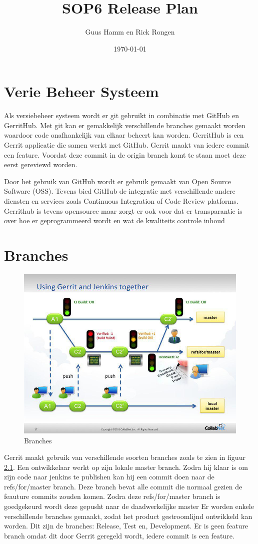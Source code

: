 \documentclass{scrreprt}
\title{SOP6 Release Plan}
\author{Guus Hamm en Rick Rongen}
\date{\today}
\begin{document}
	\maketitle
	\tableofcontents
	\newpage
	\chapter{Verie Beheer Systeem}
	Als versiebeheer systeem wordt er git gebruikt in combinatie met GitHub en GerritHub. Met git kan er gemakkelijk verschillende branches gemaakt worden waardoor code onafhankelijk van elkaar beheert kan worden.
	GerritHub is een Gerrit applicatie die samen werkt met GitHub. Gerrit maakt van iedere commit een feature. Voordat deze commit in de origin branch komt te staan moet deze eerst gereviewd worden. 
	
	Door het gebruik van GitHub wordt er gebruik gemaakt van Open Source Software (OSS). Tevens bied GitHub de integratie met verschillende andere diensten en services zoals Continuous Integration of Code Review platforms. Gerrithub is tevens opensource maar zorgt er ook voor dat er transparantie is over hoe er geprogrammeerd wordt en wat de kwaliteits controle inhoud
	\chapter{Branches}
	\begin{figure}[H]
		\centering
		\includegraphics[width=\textwidth]{git-gerrit-jenkins}
		\caption{Branches}
		\label{img:branches}
	\end{figure}
	
	Gerrit maakt gebruik van verschillende soorten branches zoals te zien in figuur {\ref{img:branches}}. Een ontwikkelaar werkt op zijn lokale master branch. Zodra hij klaar is om zijn code naar jenkins te publishen kan hij een commit doen naar de refs/for/master branch. Deze branch bevat alle commit die normaal gezien de feauture commits zouden komen. Zodra deze refs/for/master branch is goedgekeurd wordt deze gepusht naar de daadwerkelijke master
	Er worden enkele verschillende branches gemaakt, zodat het product gestroomlijnd ontwikkeld kan worden. Dit zijn de branches: Release, Test en, Development. Er is geen feature branch omdat dit door Gerrit geregeld wordt, iedere commit is een feature.
\end{document}
